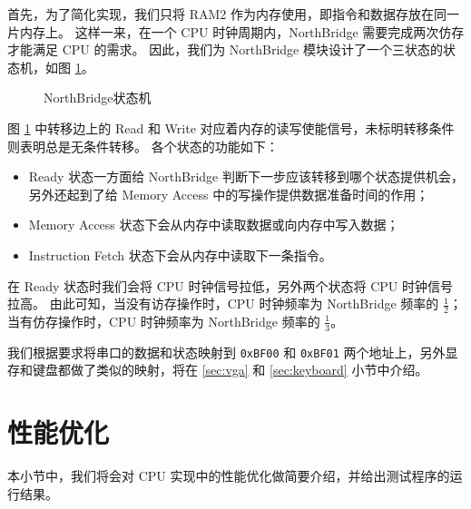 \documentclass{article}
\begin{document}
首先，为了简化实现，我们只将 RAM2 作为内存使用，即指令和数据存放在同一片内存上。
这样一来，在一个 CPU 时钟周期内，NorthBridge 需要完成两次仿存才能满足 CPU 的需求。
因此，我们为 NorthBridge 模块设计了一个三状态的状态机，如图 \ref{fig:state-machine}。

\begin{figure}[ht]
\centering
{}
\caption{NorthBridge状态机}
\label{fig:state-machine}
\end{figure}

图 \ref{fig:state-machine} 中转移边上的 Read 和 Write 对应着内存的读写使能信号，未标明转移条件则表明总是无条件转移。
各个状态的功能如下：
\begin{itemize}
    \item Ready 状态一方面给 NorthBridge 判断下一步应该转移到哪个状态提供机会，另外还起到了给 Memory Access 中的写操作提供数据准备时间的作用；
    \item Memory Access 状态下会从内存中读取数据或向内存中写入数据；
    \item Instruction Fetch 状态下会从内存中读取下一条指令。
\end{itemize}

在 Ready 状态时我们会将 CPU 时钟信号拉低，另外两个状态将 CPU 时钟信号拉高。
由此可知，当没有访存操作时，CPU 时钟频率为 NorthBridge 频率的 $\frac{1}{2}$；当有仿存操作时，CPU 时钟频率为 NorthBridge 频率的 $\frac{1}{3}$。

我们根据要求将串口的数据和状态映射到 \texttt{0xBF00} 和 \texttt{0xBF01} 两个地址上，另外显存和键盘都做了类似的映射，将在 \ref{sec:vga} 和 \ref{sec:keyboard} 小节中介绍。

\section{性能优化}

本小节中，我们将会对 CPU 实现中的性能优化做简要介绍，并给出测试程序的运行结果。
\end{document}
